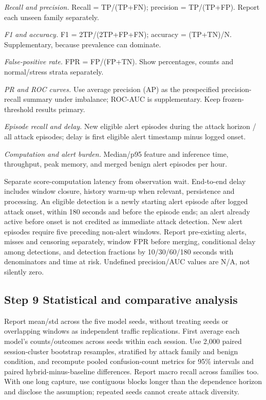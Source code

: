 \documentclass[conference]{IEEEtran}
\begin{document}
\noindent\textit{Recall and precision.} Recall = TP/(TP+FN); precision = TP/(TP+FP). Report each unseen family separately.

\noindent\textit{F1 and accuracy.} F1 = 2TP/(2TP+FP+FN); accuracy = (TP+TN)/N. Supplementary, because prevalence can dominate.

\noindent\textit{False-positive rate.} FPR = FP/(FP+TN). Show percentages, counts and normal/stress strata separately.

\noindent\textit{PR and ROC curves.} Use average precision (AP) as the prespecified precision-recall summary under imbalance; ROC-AUC is supplementary. Keep frozen-threshold results primary.

\noindent\textit{Episode recall and delay.} New eligible alert episodes during the attack horizon / all attack episodes; delay is first eligible alert timestamp minus logged onset.

\noindent\textit{Computation and alert burden.} Median/p95 feature and inference time, throughput, peak memory, and merged benign alert episodes per hour.

Separate score-computation latency from observation wait. End-to-end delay includes window closure, history warm-up when relevant, persistence and processing. An eligible detection is a newly starting alert episode after logged attack onset, within 180 seconds and before the episode ends; an alert already active before onset is not credited as immediate attack detection. New alert episodes require five preceding non-alert windows. Report pre-existing alerts, misses and censoring separately, window FPR before merging, conditional delay among detections, and detection fractions by 10/30/60/180 seconds with denominators and time at risk. Undefined precision/AUC values are N/A, not silently zero.

\subsection{Step 9 Statistical and comparative analysis}
Report mean/std across the five model seeds, without treating seeds or overlapping windows as independent traffic replications. First average each model's counts/outcomes across seeds within each session. Use 2,000 paired session-cluster bootstrap resamples, stratified by attack family and benign condition, and recompute pooled confusion-count metrics for 95\% intervals and paired hybrid-minus-baseline differences. Report macro recall across families too. With one long capture, use contiguous blocks longer than the dependence horizon and disclose the assumption; repeated seeds cannot create attack diversity.
\end{document}

